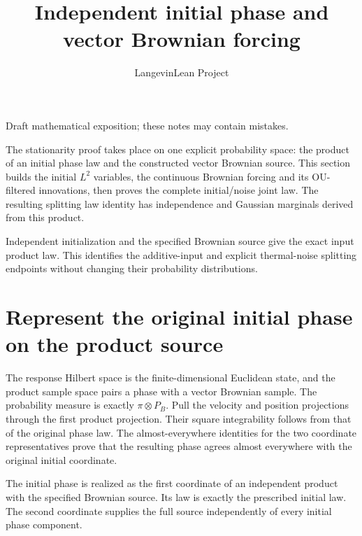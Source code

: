 \documentclass[11pt,a4paper]{article}
\title{\texorpdfstring{Independent initial phase and vector Brownian forcing}{Independent initial phase and vector Brownian forcing}}
\author{LangevinLean Project}
\date{}
\begin{document}
\maketitle
Draft mathematical exposition; these notes may contain mistakes.


The stationarity proof takes place on one explicit probability space: the product of an initial phase law and the constructed vector Brownian source. This section builds the initial \(L^{2}\) variables, the continuous Brownian forcing and its OU-filtered innovations, then proves the complete initial/\allowbreak{}noise joint law. The resulting splitting law identity has independence and Gaussian marginals derived from this product.



Independent initialization and the specified Brownian source give the exact input product law. This identifies the additive-input and explicit thermal-noise splitting endpoints without changing their probability distributions.


\section{\texorpdfstring{Represent the original initial phase on the product source}{Represent the original initial phase on the product source}}


The response Hilbert space is the finite-dimensional Euclidean state, and the product sample space pairs a phase with a vector Brownian sample. The probability measure is exactly \(\pi\otimes P_B\). Pull the velocity and position projections through the first product projection. Their square integrability follows from that of the original phase law. The almost-everywhere identities for the two coordinate representatives prove that the resulting phase agrees almost everywhere with the original initial coordinate.



The initial phase is realized as the first coordinate of an independent product with the specified Brownian source. Its law is exactly the prescribed initial law. The second coordinate supplies the full source independently of every initial phase component.
\end{document}

